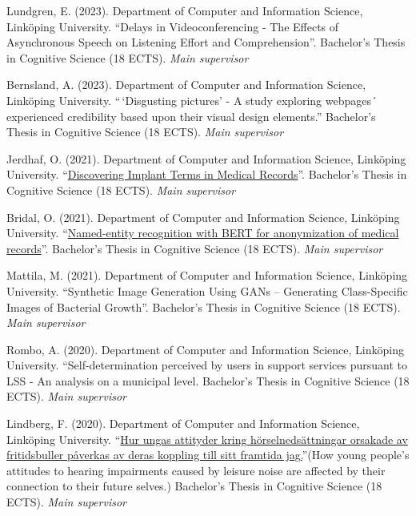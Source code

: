 \documentclass[]{article}
\begin{document}
Lundgren, E. (2023). Department of Computer and Information Science,
Linköping University. ``Delays in Videoconferencing - The Effects of
Asynchronous Speech on Listening Effort and Comprehension''. Bachelor's
Thesis in Cognitive Science (18 ECTS). \emph{Main supervisor}

Bernsland, A. (2023). Department of Computer and Information Science,
Linköping University. ``\,`Disgusting pictures' - A study exploring
webpages´ experienced credibility based upon their visual design
elements.'' Bachelor's Thesis in Cognitive Science (18 ECTS). \emph{Main
supervisor}

Jerdhaf, O. (2021). Department of Computer and Information Science,
Linköping University.
``\href{http://liu.diva-portal.org/smash/record.jsf?dswid=-6296&pid=diva2\%3A1621364&c=1&searchType=SIMPLE&language=sv&query=Jerdhaf&af=\%5B\%5D&aq=\%5B\%5B\%5D\%5D&aq2=\%5B\%5B\%5D\%5D&aqe=\%5B\%5D&noOfRows=50&sortOrder=author_sort_asc&sortOrder2=title_sort_asc&onlyFullText=false&sf=undergraduate}{Discovering
Implant Terms in Medical Records}''. Bachelor's Thesis in Cognitive
Science (18 ECTS). \emph{Main supervisor}

Bridal, O. (2021). Department of Computer and Information Science,
Linköping University.
``\href{http://liu.diva-portal.org/smash/record.jsf?dswid=-6296&faces-redirect=true&language=en&searchType=SIMPLE&query=Marsja&af=\%5B\%5D&aq=\%5B\%5B\%5D\%5D&aq2=\%5B\%5B\%5D\%5D&aqe=\%5B\%5D&pid=diva2\%3A1566701&noOfRows=50&sortOrder=author_sort_asc&sortOrder2=title_sort_asc&onlyFullText=false&sf=undergraduate}{Named-entity
recognition with BERT for anonymization of medical records}''.
Bachelor's Thesis in Cognitive Science (18 ECTS). \emph{Main supervisor}

Mattila, M. (2021). Department of Computer and Information Science,
Linköping University. ``Synthetic Image Generation Using GANs --
Generating Class-Specific Images of Bacterial Growth''. Bachelor's
Thesis in Cognitive Science (18 ECTS). \emph{Main supervisor}

Rombo, A. (2020). Department of Computer and Information Science,
Linköping University. ``Self-determination perceived by users in support
services pursuant to LSS - An analysis on a municipal level. Bachelor's
Thesis in Cognitive Science (18 ECTS). \emph{Main supervisor}

Lindberg, F. (2020). Department of Computer and Information Science,
Linköping University.
``\href{http://liu.diva-portal.org/smash/record.jsf?dswid=-6296&faces-redirect=true&language=en&searchType=SIMPLE&query=Marsja&af=\%5B\%5D&aq=\%5B\%5B\%5D\%5D&aq2=\%5B\%5B\%5D\%5D&aqe=\%5B\%5D&pid=diva2\%3A1468019&noOfRows=50&sortOrder=author_sort_asc&sortOrder2=title_sort_asc&onlyFullText=false&sf=undergraduate}{Hur
ungas attityder kring hörselnedsättningar orsakade av fritidsbuller
påverkas av deras koppling till sitt framtida jag.}''(How young people's
attitudes to hearing impairments caused by leisure noise are affected by
their connection to their future selves.) Bachelor's Thesis in Cognitive
Science (18 ECTS). \emph{Main supervisor}
\end{document}
